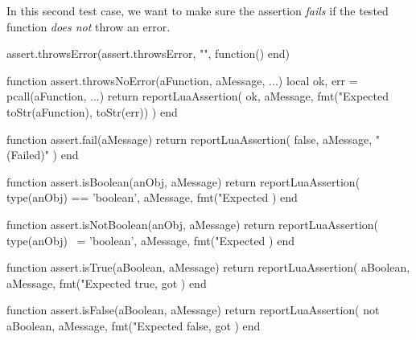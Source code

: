In this second test case, we want to make sure the assertion \emph{fails} 
if the tested function \emph{does not} throw an error.

\startLuaTest
  assert.throwsError(assert.throwsError, "", function() end)
\stopLuaTest
\stopTestCase

\stopTestSuite



\startLuaCode
function assert.throwsNoError(aFunction, aMessage, ...)
  local ok, err = pcall(aFunction, ...)
  return reportLuaAssertion(
    ok,
    aMessage,
    fmt("Expected %
      toStr(aFunction), toStr(err))
  )
end
\stopLuaCode

\stopTestSuite


\startLuaCode
function assert.fail(aMessage)
  return reportLuaAssertion(
    false,
    aMessage,
    "(Failed)"
  )
end
\stopLuaCode

\stopTestSuite


\startLuaCode
function assert.isBoolean(anObj, aMessage)
  return reportLuaAssertion(
    type(anObj) == 'boolean',
    aMessage,
    fmt("Expected %
  )
end
\stopLuaCode

\stopTestSuite


\startLuaCode
function assert.isNotBoolean(anObj, aMessage)
  return reportLuaAssertion(
    type(anObj) ~= 'boolean',
    aMessage,
    fmt("Expected %
  )
end
\stopLuaCode

\stopTestSuite


\startLuaCode
function assert.isTrue(aBoolean, aMessage)
  return reportLuaAssertion(
    aBoolean,
    aMessage,
    fmt("Expected true, got %
  )
end
\stopLuaCode

\stopTestSuite


\startLuaCode
function assert.isFalse(aBoolean, aMessage)
  return reportLuaAssertion(
    not aBoolean,
    aMessage,
    fmt("Expected false, got %
  )
end
\stopLuaCode

\stopTestSuite


